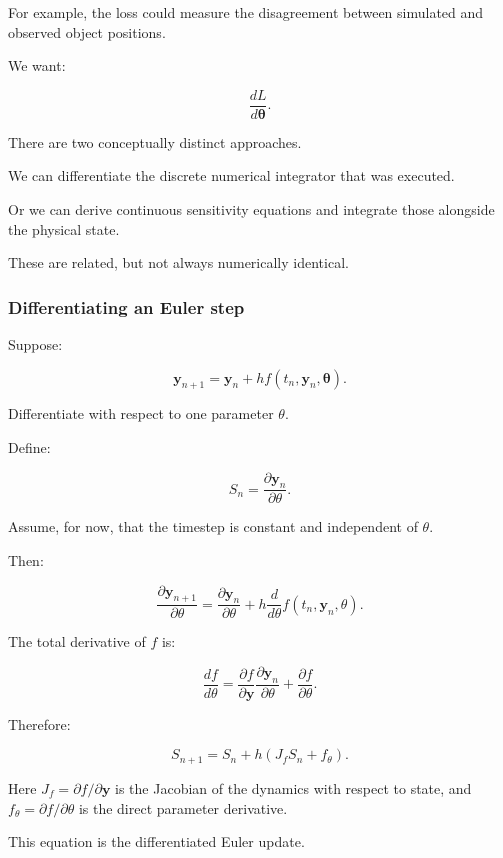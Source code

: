 For example, the loss could measure the disagreement between simulated and observed object positions.

We want:

\[
\boxed{\frac{dL}{d\boldsymbol\theta}}.
\]

There are two conceptually distinct approaches.

We can differentiate the discrete numerical integrator that was executed.

Or we can derive continuous sensitivity equations and integrate those alongside the physical state.

These are related, but not always numerically identical.

\subsubsection{Differentiating an Euler step}\label{02-foundations-ii-ch022-differentiating-an-euler-step}

\hypertarget{02-foundations-ii-ch022-differentiating-an-euler-step}{}

Suppose:

\[
\mathbf y_{n+1} = \mathbf y_n+ h f(t_n,\mathbf y_n,\boldsymbol\theta).
\]

Differentiate with respect to one parameter \(\theta\).

Define:

\[
S_n=\frac{\partial\mathbf y_n}{\partial\theta}.
\]

Assume, for now, that the timestep is constant and independent of \(\theta\).

Then:

\[
\frac{\partial\mathbf y_{n+1}}{\partial\theta} = \frac{\partial\mathbf y_n}{\partial\theta} + h\frac{d}{d\theta} f(t_n,\mathbf y_n,\theta).
\]

The total derivative of \(f\) is:

\[
\frac{df}{d\theta} = \frac{\partial f}{\partial\mathbf y} \frac{\partial\mathbf y_n}{\partial\theta} + \frac{\partial f}{\partial\theta}.
\]

Therefore:

\[
\boxed{ S_{n+1} = S_n+ h\left(J_fS_n+f_\theta\right) }.
\]

Here \(J_f=\partial f/\partial\mathbf y\) is the Jacobian of the dynamics with respect to state, and \(f_\theta=\partial f/\partial\theta\) is the direct parameter derivative.

This equation is the differentiated Euler update.

